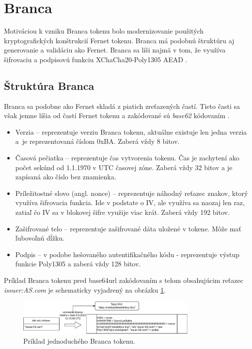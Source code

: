 \section{Branca}

Motiváciou k vzniku Branca tokenu \cite{branca_spec} bolo modernizovanie použitých kryptografických konštrukcií Fernet tokenu. Branca má podobnú štruktúru aj generovanie a validáciu ako Fernet. Branca sa líši najmä v tom, že využíva šifrovaciu a podpisovú funkciu XChaCha20-Poly1305 AEAD \cite{chacha_poly}.

\subsection{Štruktúra Branca}

Branca sa podobne ako Fernet skladá z piatich zreťazených častí. Tieto časti sa však jemne líšia od častí Fernet tokenu a zakódované sú \textit{base62} kódovaním \cite{base62}.

\begin{itemize}
    \item Verzia -- reprezentuje verziu Branca tokenu, aktuálne existuje len jedna verzia a~je reprezentovaná číslom 0xBA. Zaberá vždy 8 bitov.
    \item Časová pečiatka -- reprezentuje čas vytvorenia tokenu. Čas je zachytení ako počet sekúnd od 1.1.1970 v UTC časovej zóne. Zaberá vždy 32 bitov a je zapísaná ako číslo bez znamienka.
    \item Príležitostné slovo (angl. nonce) -- reprezentuje náhodný reťazec znakov, ktorý využíva šifrovacia funkcia. Ide v podstate o IV, ale využíva sa naozaj len raz, zatiaľ čo IV sa v blokovej šifre využije viac krát. Zaberá vždy 192 bitov.
    \item Zašifrované telo -- reprezentuje zašifrované dáta uložené v tokene. Môže mať ľubovoľnú dĺžku.
    \item Podpis -- v podobe hešovaného autentifikačného kódu - reprezentuje výstup funkcie Poly1305 a zaberá vždy 128 bitov.
\end{itemize}

Príklad Branca tokenu pred base64url zakódovaním s telom obsahujúcim reťazec \textit{issuer:AS.com} je schematicky vyjadrený na obrázku \ref{fig:branca_token}.

\begin{figure}[H]
    \centerline{\includegraphics[width=0.8\textwidth]{images/branca_token}}
    \caption[Branca token]{Príklad jednoduchého Branca tokenu.}
    \label{fig:branca_token}
\end{figure}

